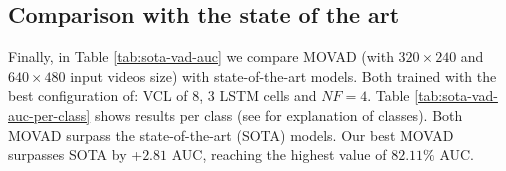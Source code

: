 \subsection{Comparison with the state of the art}
Finally, in Table \ref{tab:sota-vad-auc} we compare MOVAD (with $320\times240$ and $640\times480$ input videos size) with state-of-the-art models.
Both trained with the best configuration of: VCL of 8, 3 LSTM cells and $\mathit{NF}=4$.
Table \ref{tab:sota-vad-auc-per-class} shows results per class (see \cite{9712446} for explanation of classes).
Both MOVAD surpass the state-of-the-art (SOTA) models.
Our best MOVAD surpasses SOTA by +$2.81$ AUC, reaching the highest value of $82.11\%$ AUC.

